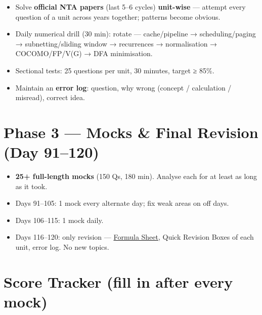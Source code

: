 \begin{itemize}
\tightlist
\item
  Solve \textbf{official NTA papers} (last 5--6 cycles) \textbf{unit-wise} --- attempt every question of a unit across years together; patterns become obvious.
\item
  Daily numerical drill (30 min): rotate --- cache/pipeline → scheduling/paging → subnetting/sliding window → recurrences → normalisation → COCOMO/FP/V(G) → DFA minimisation.
\item
  Sectional tests: 25 questions per unit, 30 minutes, target ≥ 85\%.
\item
  Maintain an \textbf{error log}: question, why wrong (concept / calculation / misread), correct idea.
\end{itemize}

\needspace{95pt}

\hypertarget{rev-plan--phase-3--mocks--final-revision-day-91120}{%
\section{Phase 3 --- Mocks \& Final Revision (Day 91--120)}\label{rev-plan--phase-3--mocks--final-revision-day-91120}}

\begin{itemize}
\tightlist
\item
  \textbf{25+ full-length mocks} (150 Qs, 180 min). Analyse each for at least as long as it took.
\item
  Days 91--105: 1 mock every alternate day; fix weak areas on off days.
\item
  Days 106--115: 1 mock daily.
\item
  Days 116--120: only revision --- \protect\hyperlink{rev-formula}{Formula Sheet}, Quick Revision Boxes of each unit, error log. No new topics.
\end{itemize}

\needspace{130pt}

\hypertarget{rev-plan--score-tracker-fill-in-after-every-mock}{%
\section{Score Tracker (fill in after every mock)}\label{rev-plan--score-tracker-fill-in-after-every-mock}}

\begingroup\small

